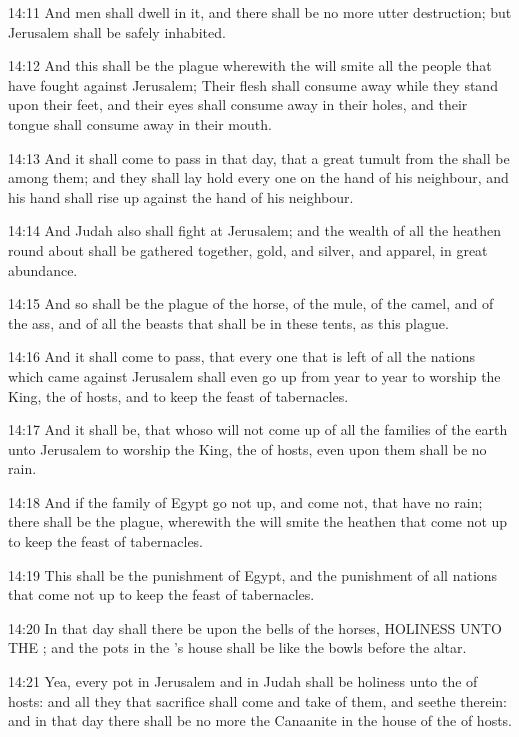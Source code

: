 14:11 And men shall dwell in it, and there shall be no more utter
destruction; but Jerusalem shall be safely inhabited.

14:12 And this shall be the plague wherewith the \LORD will smite all
the people that have fought against Jerusalem; Their flesh shall
consume away while they stand upon their feet, and their eyes shall
consume away in their holes, and their tongue shall consume away in
their mouth.

14:13 And it shall come to pass in that day, that a great tumult from
the \LORD shall be among them; and they shall lay hold every one on the
hand of his neighbour, and his hand shall rise up against the hand of
his neighbour.

14:14 And Judah also shall fight at Jerusalem; and the wealth of all
the heathen round about shall be gathered together, gold, and silver,
and apparel, in great abundance.

14:15 And so shall be the plague of the horse, of the mule, of the
camel, and of the ass, and of all the beasts that shall be in these
tents, as this plague.

14:16 And it shall come to pass, that every one that is left of all
the nations which came against Jerusalem shall even go up from year to
year to worship the King, the \LORD of hosts, and to keep the feast of
tabernacles.

14:17 And it shall be, that whoso will not come up of all the families
of the earth unto Jerusalem to worship the King, the \LORD of hosts,
even upon them shall be no rain.

14:18 And if the family of Egypt go not up, and come not, that have no
rain; there shall be the plague, wherewith the \LORD will smite the
heathen that come not up to keep the feast of tabernacles.

14:19 This shall be the punishment of Egypt, and the punishment of all
nations that come not up to keep the feast of tabernacles.

14:20 In that day shall there be upon the bells of the horses,
HOLINESS UNTO THE \LORD; and the pots in the \LORD's house shall be like
the bowls before the altar.

14:21 Yea, every pot in Jerusalem and in Judah shall be holiness unto
the \LORD of hosts: and all they that sacrifice shall come and take of
them, and seethe therein: and in that day there shall be no more the
Canaanite in the house of the \LORD of hosts.

